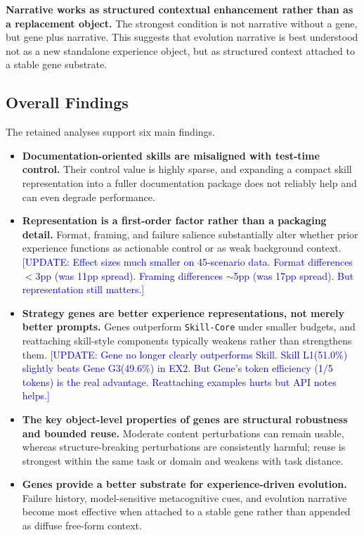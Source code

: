 \documentclass{article}
\newcommand{\blue}[1]{\textcolor{blue}{#1}}
\newcommand{\nbf}[1]{{\noindent \textbf{#1}}}
\begin{document}
\nbf{Narrative works as structured contextual enhancement rather than as a replacement object.}
The strongest condition is not narrative without a gene, but gene plus narrative. 
This suggests that evolution narrative is best understood not as a new standalone experience object, but as structured context attached to a stable gene substrate.



\subsection{Overall Findings}

The retained analyses support six main findings.

\begin{itemize}[leftmargin=1.2em, itemsep=0.25em, topsep=0.2em, parsep=0pt, partopsep=0pt]

    \item \nbf{Documentation-oriented skills are misaligned with test-time control.}
    Their control value is highly sparse, and expanding a compact skill representation into a fuller documentation package does not reliably help and can even degrade performance.

    \item \nbf{Representation is a first-order factor rather than a packaging detail.}
    Format, framing, and failure salience substantially alter whether prior experience functions as actionable control or as weak background context.
    \blue{[UPDATE: Effect sizes much smaller on 45-scenario data. Format differences $<$3pp (was 11pp spread). Framing differences $\sim$5pp (was 17pp spread). But representation still matters.]}

    \item \nbf{Strategy genes are better experience representations, not merely better prompts.}
    Genes outperform \texttt{Skill-Core} under smaller budgets, and reattaching skill-style components typically weakens rather than strengthens them.
    \blue{[UPDATE: Gene no longer clearly outperforms Skill. Skill L1(51.0\%) slightly beats Gene G3(49.6\%) in EX2. But Gene's token efficiency (1/5 tokens) is the real advantage. Reattaching examples hurts but API notes helps.]}

    \item \nbf{The key object-level properties of genes are structural robustness and bounded reuse.}
    Moderate content perturbations can remain usable, whereas structure-breaking perturbations are consistently harmful; reuse is strongest within the same task or domain and weakens with task distance.

    \item \nbf{Genes provide a better substrate for experience-driven evolution.}
    Failure history, model-sensitive metacognitive cues, and evolution narrative become most effective when attached to a stable gene rather than appended as diffuse free-form context.

\end{itemize}
\end{document}
